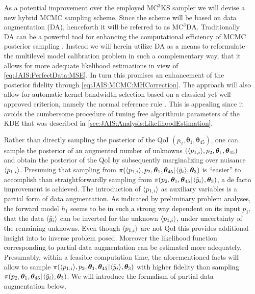 As a potential improvement over the employed \(\text{MC}^3\text{KS}\) sampler we will devise a new hybrid MCMC sampling scheme.
Since the scheme will be based on data augmentation (DA), henceforth it will be referred to as \(\text{MC}^3\text{DA}\).
Traditionally DA can be a powerful tool for enhancing the computational efficiency of MCMC posterior sampling \cite{MCMC:Tanner1987,MCMC:Dyk2001,MCMC:Dyk2003}.
Instead we will herein utilize DA as a means to reformulate the multilevel model calibration problem in such a complementary way,
that it allows for more adequate likelihood estimations in view of \cref{eq:JAIS:PerfectData:MSE}.
In turn this promises an enhancement of the posterior fidelity through \cref{eq:JAIS:MCMC:MHCorrection}.
The approach will also allow for automatic kernel bandwidth selection based on a classical yet well-approved criterion, namely the normal reference rule \cite{Statistics:Silverman1986}.
This is appealing since it avoids the cumbersome procedure of tuning free algorithmic parameters of the KDE that was described in \cref{sec:JAIS:Analysis:LikelihoodEstimation}.
\par %
Rather than directly sampling the posterior of the QoI \((p_2,\bm{\theta}_1,\bm{\theta}_{45})\), one can sample the posterior of an augmented number of unknowns
\((\langle{p_{1,i}}\rangle,p_2,\bm{\theta}_1,\bm{\theta}_{45})\) and obtain the posterior of the QoI by subsequently marginalizing over nuisance \(\langle{p_{1,i}}\rangle\).
Presuming that sampling from \(\pi(\langle{p_{1,i}}\rangle,p_2,\bm{\theta}_1,\bm{\theta}_{45} {\:\!}|{\:\!} \langle{\tilde{y}_i}\rangle,\bm{\theta}_3)\) is ``easier'' to accomplish
than straightforwardly sampling from \(\pi(p_2,\bm{\theta}_1,\bm{\theta}_{45} {\:\!}|{\:\!} \langle{\tilde{y}_i}\rangle,\bm{\theta}_3)\), a de facto improvement is achieved.
The introduction of \(\langle{p_{1,i}}\rangle\) as auxiliary variables is a partial form of data augmentation.
As indicated by preliminary problem analyses, the forward model \(h_1\) seems to be in such a strong way dependent on its input \(p_1\),
that the data \(\langle{\tilde{y}_i}\rangle\) can be inverted for the unknown \(\langle{p_{1,i}}\rangle\), under uncertainty of the remaining unknowns.
Even though \(\langle{p_{1,i}}\rangle\) are not QoI this provides additional insight into to inverse problem posed.
Moreover the likelihood function corresponding to partial data augmentation can be estimated more adequately.
Presumably, within a feasible computation time, the aforementioned facts will allow to sample \(\pi(\langle{p_{1,i}}\rangle,p_2,\bm{\theta}_1,\bm{\theta}_{45} {\:\!}|{\:\!} \langle{\tilde{y}_i}\rangle,\bm{\theta}_3)\)
with higher fidelity than sampling \(\pi(p_2,\bm{\theta}_1,\bm{\theta}_{45} {\:\!}|{\:\!} \langle{\tilde{y}_i}\rangle,\bm{\theta}_3)\).
We will introduce the formalism of partial data augmentation below.

